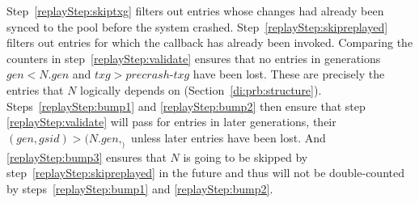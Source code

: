 \documentclass[12pt,a4paper,twoside]{book}
\begin{document}
Step~\ref{replayStep:skiptxg} filters out entries whose changes had already been synced to the pool before the system crashed.
Step~\ref{replayStep:skipreplayed} filters out entries for which the callback has already been invoked.
Comparing the counters in step~\ref{replayStep:validate} ensures that no entries in generations $gen < N.gen$ and $txg > precrash\text{-}txg$ have been lost.
These are precisely the entries that $N$ logically depends on (Section~\ref{di:prb:structure}).
Steps~\ref{replayStep:bump1} and \ref{replayStep:bump2} then ensure that step \ref{replayStep:validate} will pass for entries in later generations, their $(gen, gsid) > (N.gen, _)$ unless later entries have been lost.
And \ref{replayStep:bump3} ensures that $N$ is going to be skipped by step~\ref{replayStep:skipreplayed} in the future and thus will not be double-counted by steps~\ref{replayStep:bump1} and \ref{replayStep:bump2}.
\end{document}
